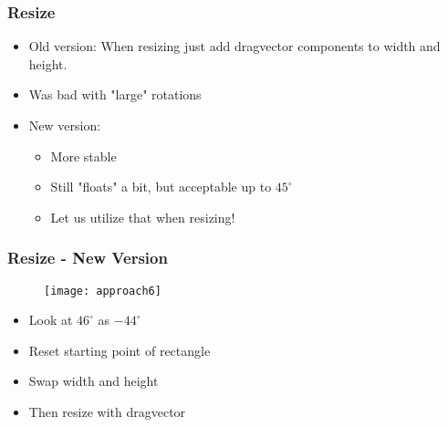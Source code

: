 
\begin{frame}
	\frametitle{Resize}
	\begin{itemize}
		\item Old version: When resizing just add dragvector components to width and height.
		\item Was bad with "large" rotations
		\item New version:
		\begin{itemize}
			\item More stable
			\item Still "floats" a bit, but acceptable up to $45 ^\circ$
			\item Let us utilize that when resizing!
		\end{itemize}
	\end{itemize}
\end{frame}

\begin{frame}
	\frametitle{Resize - New Version}
			\begin{figure}
			\centering
				\texttt{[image: approach6]}
			\end{figure}
			\begin{itemize}
			\item Look at $46^\circ$ as $-44^\circ$
			\item Reset starting point of rectangle
			\item Swap width and height
			\item Then resize with dragvector
			\end{itemize}
			
\end{frame}

